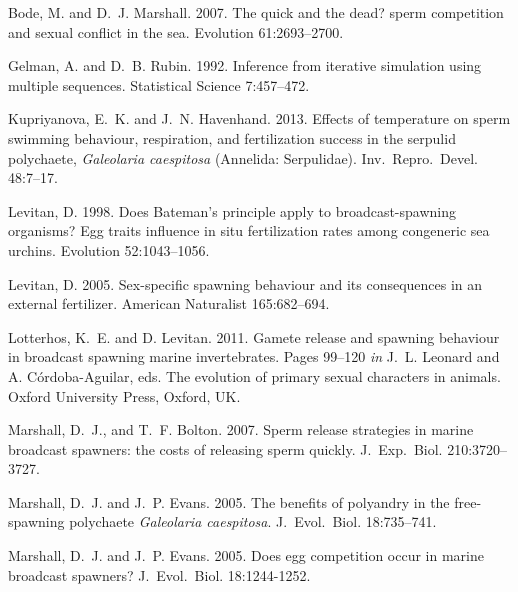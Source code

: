 \documentclass{article}
\begin{document}
\begin{thebibliography}{}

Bode, M. and D.~J. Marshall. 2007.
\newblock The quick and the dead? sperm competition and sexual conflict in the sea.
\newblock Evolution 61:2693--2700.

Gelman, A. and D.~B. Rubin. 1992.
\newblock Inference from iterative simulation using multiple sequences.
\newblock Statistical Science 7:457--472.

Kupriyanova, E.~K. and J.~N. Havenhand. 2013.
\newblock Effects of temperature on sperm swimming behaviour, respiration, and fertilization success in the serpulid polychaete, \textit{Galeolaria caespitosa} (Annelida: Serpulidae).
\newblock Inv.~Repro.~Devel. 48:7--17.

Levitan, D. 1998.
\newblock Does Bateman's principle apply to broadcast-spawning organisms? Egg traits influence in situ fertilization rates among congeneric sea urchins.
\newblock Evolution 52:1043--1056.

Levitan, D. 2005.
\newblock Sex-specific spawning behaviour and its consequences in an external fertilizer.
\newblock American Naturalist 165:682--694.

Lotterhos, K.~E. and D. Levitan. 2011.
\newblock Gamete release and spawning behaviour in broadcast spawning marine invertebrates.
\newblock Pages 99--120 \emph{in} J.~L. Leonard and A. C\'{o}rdoba-Aguilar, eds. The evolution of primary sexual characters in animals. Oxford University Press, Oxford, UK.

Marshall, D.~J., and T.~F. Bolton. 2007.
\newblock Sperm release strategies in marine broadcast spawners: the costs of releasing sperm quickly.
\newblock J.~Exp.~Biol. 210:3720--3727.

Marshall, D.~J. and J.~P. Evans. 2005.
\newblock The benefits of polyandry in the free-spawning polychaete \textit{Galeolaria caespitosa}.
\newblock J.~Evol.~Biol. 18:735--741.

Marshall, D.~J. and J.~P. Evans. 2005.
\newblock Does egg competition occur in marine broadcast spawners? 
\newblock J.~Evol.~Biol. 18:1244-1252.


\end{thebibliography}
\end{document}
